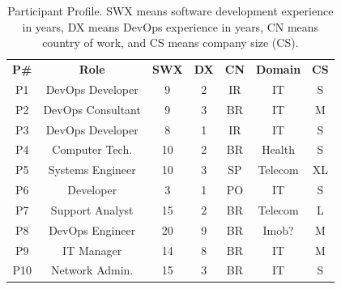 \begin{table}[t]
\centering
\caption{Participant Profile. SWX means software development experience in years, DX means DevOps experience in years, CN means country of work, and CS means company size (CS).}
\label{participant_table}
\begin{tabular}{ccccccc}
\textbf{P\#}          & \textbf{Role}         & \textbf{SWX} & \textbf{DX} & \textbf{CN}   & \textbf{Domain}    & \multicolumn{1}{l}{\textbf{CS}} \\
P1                   & DevOps Developer      & 9            & 2           & IR            & IT                 & S                               \\

P2                   & DevOps Consultant       & 9            & 3           & BR            & IT                 & M                               \\

P3                   & DevOps Developer      & 8            & 1           & IR            & IT                 & S                               \\

P4                   & Computer Tech.        & 10           & 2           & BR            & Health             & S                               \\

P5                   & Systems Engineer      & 10           & 3           & SP            & Telecom            & XL                              \\

P6                   & Developer             & 3            & 1           & PO            & IT                 & S                               \\

P7                   & Support Analyst       & 15           & 2           & BR            & Telecom            & L                               \\

P8                   & DevOps Engineer       & 20           & 9           & BR            & Imob?              & M                               \\

P9                   & IT Manager            & 14           & 8           & BR            & IT                 & M                               \\

P10                  & Network Admin.        & 15           & 3           & BR            & IT                 & S                               \\


\end{tabular}
\end{table}
